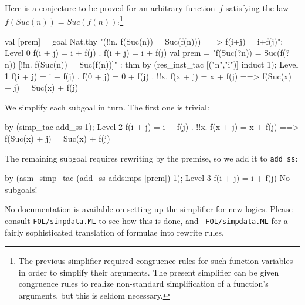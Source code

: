\medskip
Here is a conjecture to be proved for an arbitrary function~$f$ satisfying
the law $f(Suc(n)) = Suc(f(n))$:\footnote{The previous
  simplifier required congruence rules for such function variables in
  order to simplify their arguments.  The present simplifier can be given
  congruence rules to realize non-standard simplification of a function's
  arguments, but this is seldom necessary.}
\begin{ttbox}
val [prem] = goal Nat.thy
    "(!!n. f(Suc(n)) = Suc(f(n))) ==> f(i+j) = i+f(j)";
{\out Level 0}
{\out f(i + j) = i + f(j)}
{. f(i + j) = i + f(j)}
{\out val prem = "f(Suc(?n)) = Suc(f(?n))  [!!n. f(Suc(n)) = Suc(f(n))]" : thm}
\ttbreak
by (res_inst_tac [("n","i")] induct 1);
{\out Level 1}
{\out f(i + j) = i + f(j)}
{. f(0 + j) = 0 + f(j)}
{. !!x. f(x + j) = x + f(j) ==> f(Suc(x) + j) = Suc(x) + f(j)}
\end{ttbox}
We simplify each subgoal in turn.  The first one is trivial:
\begin{ttbox}
by (simp_tac add_ss 1);
{\out Level 2}
{\out f(i + j) = i + f(j)}
{. !!x. f(x + j) = x + f(j) ==> f(Suc(x) + j) = Suc(x) + f(j)}
\end{ttbox}
The remaining subgoal requires rewriting by the premise, so we add it to
{\tt add_ss}: 
\begin{ttbox}
by (asm_simp_tac (add_ss addsimps [prem]) 1);
{\out Level 3}
{\out f(i + j) = i + f(j)}
{\out No subgoals!}
\end{ttbox}

No documentation is available on setting up the simplifier for new logics.
Please consult {\tt FOL/simpdata.ML} to see how this is done, and {\tt
  FOL/simpdata.ML} for a fairly sophisticated translation of formulae into
rewrite rules.




